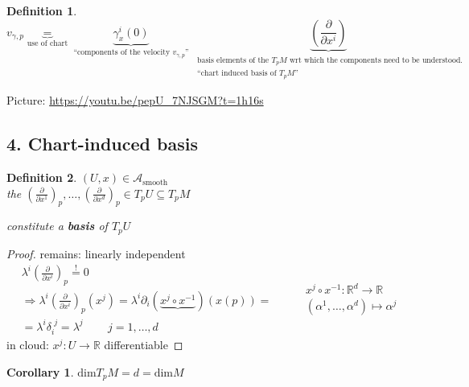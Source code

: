 \documentclass[10pt]{amsart}
\newtheorem{corollary}{Corollary}
\newtheorem{definition}{Definition}
\begin{document}
\begin{multicols*}{2}
\begin{definition}
		\[
		v_{\gamma,p} \underbrace{=}_{\text{use of chart} } \underbrace{ \gamma_x^i(0) }_{ \text{ ``components of the velocity $v_{\gamma,p}$'' } } \underbrace{ \left( \frac{ \partial }{ \partial x^i} \right)}_{ \substack{ \text{ basis elements of the $T_pM$ wrt which the components need to be understood.} \\
				\text{ ``chart induced basis of $T_pM$''} } } 
		\]
	\end{definition}
	
	Picture: \url{https://youtu.be/pepU_7NJSGM?t=1h16s}
	
	\subsection{4. Chart-induced basis}
	
	\begin{definition}
		$(U,x) \in \mathcal{A}_{\text{smooth}}$ \\
		the $\left( \frac{ \partial }{ \partial x^1} \right)_p , \dots , \left( \frac{ \partial }{ \partial x^d} \right)_p \in T_pU \subseteq T_pM$
		
		constitute a \textbf{basis} of $T_pU$
		
	\end{definition}
	
	\begin{proof} remains: linearly independent 
		\[
		\begin{gathered}
		\lambda^i \left( \frac{ \partial }{ \partial x^i} \right)_p \overset{!}{=} 0  \\
		\Longrightarrow \lambda^i \left( \frac{ \partial }{ \partial x^i} \right)_p(x^j) = \lambda^i \partial_i (\underbrace{ x^j \circ x^{-1} }_{} )( x(p)) = \\
		= \lambda^i \delta_i^{\,\,j} = \lambda^j \quad \quad \, j = 1 , \dots , d
		\end{gathered} \quad \quad \, \begin{gathered}
		x^j \circ x^{-1} : \mathbb{R}^d \to \mathbb{R} \\
		(\alpha^1 , \dots , \alpha^d) \mapsto \alpha^j 
		\end{gathered}
		\]
		in cloud: $x^j : U \to \mathbb{R}$ differentiable
		
		
		
		
	\end{proof}
	
	
	\begin{corollary}
		$ \text{dim}T_pM = d = \text{dim}M$
	\end{corollary}
	

\end{multicols*}
\end{document}
